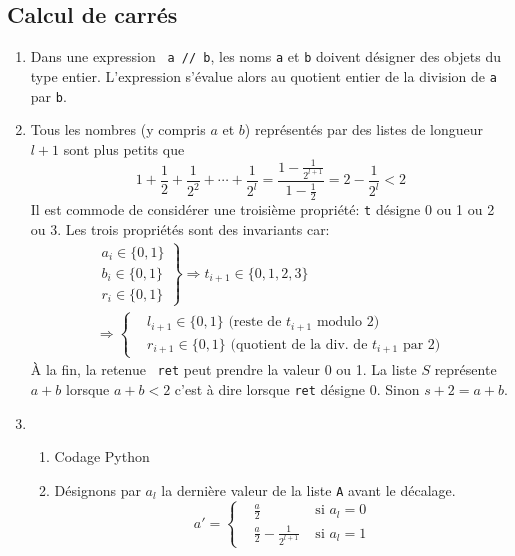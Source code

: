 \subsection{Calcul de carrés}
\begin{enumerate}
  \item Dans une expression \texttt{ a // b}, les noms \texttt{a} et \texttt{b} doivent désigner des objets du type entier. L'expression s'évalue alors au quotient entier de la division de \texttt{a} par \texttt{b}. 
  \item Tous les nombres (y compris $a$ et $b$) représentés par des listes de longueur $l+1$ sont plus petits que
\begin{displaymath}
  1 + \frac{1}{2} + \frac{1}{2^2} + \cdots + \frac{1}{2^l} = \frac{1-\frac{1}{2^{l+1}}}{1-\frac{1}{2}}= 2 -\frac{1}{2^l} < 2
\end{displaymath}
Il est commode de considérer une troisième propriété: \og \texttt{t} désigne 0 ou 1 ou 2 ou 3\fg. Les trois propriétés sont des invariants car:
\begin{multline*}
\left. 
\begin{aligned}
a_i \in \{0,1\}\\ b_i \in \{0,1\} \\r_i \in\{0,1\}  
\end{aligned}
\right\rbrace 
\Rightarrow t_{i+1} \in \{0,1,2,3\}\\
\Rightarrow
\left\lbrace 
\begin{aligned}
&l_{i+1} \in\{0,1\}\text{ (reste de $t_{i+1}$ modulo 2)}\\
&r_{i+1} \in\{0,1\}\text{ (quotient de la div. de $t_{i+1}$ par 2)}  
\end{aligned}
\right. 
\end{multline*}
\`A la fin, la \og retenue\fg~ \texttt{ret} peut prendre la valeur 0 ou 1. La liste $S$ représente $a+b$ lorsque $a+b<2$ c'est à dire lorsque \texttt{ret} désigne $0$. Sinon $s+2 = a+b$.
  \item 
\begin{enumerate}
  \item Codage Python

\item Désignons par $a_l$ la dernière valeur de la liste \texttt{A} avant le décalage.
\begin{displaymath}
  a' =
\left\lbrace 
\begin{aligned}
&\frac{a}{2}&\text{ si } a_l = 0 \\
&\frac{a}{2} - \frac{1}{2^{l+1}}&\text{ si } a_l = 1 
\end{aligned}
\right. 
\end{displaymath}
\end{enumerate}


\end{enumerate}
